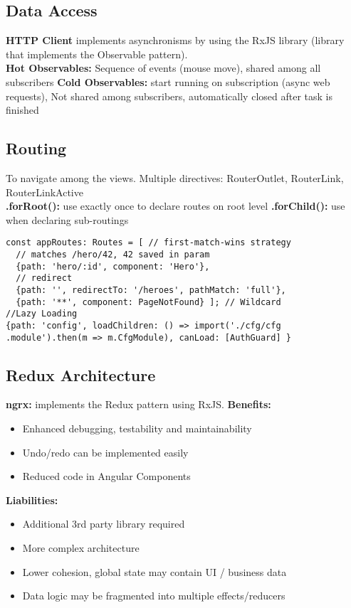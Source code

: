 \subsection{Data Access}
\textcolor{b}{\textbf{HTTP Client}} implements asynchronisms by using the RxJS library (library that implements the Observable pattern).\\
\textbf{Hot Observables:} Sequence of events (mouse move), shared among all subscribers \textbf{Cold Observables:} start running on subscription (async web requests), Not shared among subscribers, automatically closed after task is finished
\subsection{Routing}
To navigate among the views. Multiple directives: \textcolor{b}{RouterOutlet, RouterLink, RouterLinkActive}\\
\textbf{.forRoot():} use exactly once to declare routes on root level \textbf{.forChild():} use when declaring sub-routings
\begin{lstlisting}[style=htmlcssjs]
const appRoutes: Routes = [ // first-match-wins strategy
  // matches /hero/42, 42 saved in param
  {path: 'hero/:id', component: 'Hero'},
  // redirect
  {path: '', redirectTo: '/heroes', pathMatch: 'full'},
  {path: '**', component: PageNotFound} ]; // Wildcard
//Lazy Loading
{path: 'config', loadChildren: () => import('./cfg/cfg
.module').then(m => m.CfgModule), canLoad: [AuthGuard] }
\end{lstlisting}
\subsection{Redux Architecture}
\textbf{ngrx:} implements the Redux pattern using RxJS.
\textbf{Benefits:}
\begin{itemize}[topsep=0pt, leftmargin=3mm]
    \setlength\itemsep{-0.3em}
    \item Enhanced debugging, testability and maintainability
    \item Undo/redo can be implemented easily
    \item Reduced code in Angular Components
\end{itemize}
\textbf{Liabilities:}
\begin{itemize}[topsep=0pt, leftmargin=3mm]
    \setlength\itemsep{-0.3em}
    \item Additional 3rd party library required
    \item More complex architecture
    \item Lower cohesion, global state may contain UI / business data
    \item Data logic may be fragmented into multiple effects/reducers
\end{itemize}